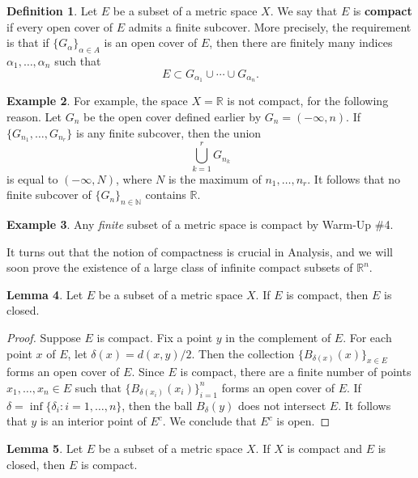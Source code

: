 \documentclass[12pt]{article}
\theoremstyle{definition}
\newtheorem{definition}{Definition}
\newtheorem{example}[definition]{Example}
\theoremstyle{theorem}
\newtheorem{lemma}[definition]{Lemma}
\begin{document}
\begin{definition}
Let $E$ be a subset of a metric space $X.$ We say that $E$ is \textbf{compact} if every open cover of $E$ admits a finite subcover. More precisely, the requirement is that if $\{G_\alpha\}_{\alpha \in A}$ is an open cover of $E$, then there are finitely many indices $\alpha_1, \ldots, \alpha_n$ such that
\[
E \subset G_{\alpha_1} \cup \cdots \cup G_{\alpha_n}.
\]
\end{definition}

\begin{example}
For example, the space $X = \mathbb{R}$ is not compact, for the following reason. Let $G_n$ be the open cover defined earlier by $G_n = (-\infty, n)$. If $\{G_{n_1}, \ldots, G_{n_r}\}$ is any finite subcover, then the union 
\[
\bigcup_{k = 1}^r G_{n_k}
\]
is equal to $(-\infty, N)$, where $N$ is the maximum of $n_1, \ldots, n_r$. It follows that no finite subcover of $\{G_n\}_{n \in \mathbb{N}}$ contains $\mathbb{R}$. 
\end{example}

\begin{example}
Any \emph{finite} subset of a metric space is compact by Warm-Up \#4. 
\end{example}

It turns out that the notion of compactness is crucial in Analysis, and we will soon prove the existence of a large class of infinite compact subsets of $\mathbb{R}^n$. 

\begin{lemma}\label{lem:compact1}
Let $E$ be a subset of a metric space $X$. If $E$ is compact, then $E$ is closed. 
\end{lemma}

\begin{proof}
Suppose $E$ is compact. Fix a point $y$ in the complement of $E$. For each point $x$ of $E$, let $\delta(x) = d(x,y)/2$. Then the collection $\{B_{\delta(x)}(x)\}_{x \in E}$ forms an open cover of $E$. Since $E$ is compact, there are a finite number of points $x_1, \ldots, x_n \in E$ such that $\{B_{\delta(x_i)}(x_i)\}_{i=1}^n$ forms an open cover of $E$. If $\delta = \inf\{\delta_i : i=1, \ldots, n\}$, then the ball $B_\delta(y)$ does not intersect $E$. It follows that $y$ is an interior point of $E^c$. We conclude that $E^c$ is open. 
\end{proof}

\begin{lemma}\label{lem:compact2}
Let $E$ be a subset of a metric space $X$. If $X$ is compact and $E$ is closed, then $E$ is compact. 
\end{lemma}
\end{document}
